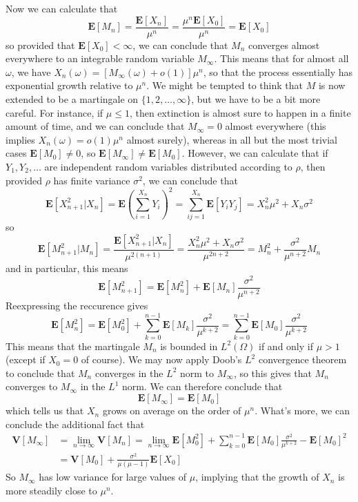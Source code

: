 Now we can calculate that
%
\[ \mathbf{E}[M_n] = \frac{\mathbf{E}[X_n]}{\mu^n} = \frac{\mu^n \mathbf{E}[X_0]}{\mu^n} = \mathbf{E}[X_0] \]
%
so provided that $\mathbf{E}[X_0] < \infty$, we can conclude that $M_n$ converges almost everywhere to an integrable random variable $M_\infty$. This means that for almost all $\omega$, we have $X_n(\omega) = [M_\infty(\omega) + o(1)] \mu^n$, so that the process essentially has exponential growth relative to $\mu^n$. We might be tempted to think that $M$ is now extended to be a martingale on $\{ 1, 2, \dots, \infty \}$, but we have to be a bit more careful. For instance, if $\mu \leq 1$, then extinction is almost sure to happen in a finite amount of time, and we can conclude that $M_\infty = 0$ almost everywhere (this implies $X_n(\omega) = o(1) \mu^n$ almost surely), whereas in all but the most trivial cases $\mathbf{E}[M_0] \neq 0$, so $\mathbf{E}[M_\infty] \neq \mathbf{E}[M_0]$. However, we can calculate that if $Y_1, Y_2, \dots$ are independent random variables distributed according to $\rho$, then provided $\rho$ has finite variance $\sigma^2$, we can conclude that
%
\[ \mathbf{E}[X_{n+1}^2|X_n] = \mathbf{E} \left( \sum_{i = 1}^{X_n} Y_i \right)^2 = \sum_{ij = 1}^{X_n} \mathbf{E}[Y_iY_j] = X_n^2 \mu^2 + X_n \sigma^2 \]
%
so
%
\[ \mathbf{E}[M_{n+1}^2|M_n] = \frac{\mathbf{E}[X_{n+1}^2|X_n]}{\mu^{2(n+1)}} = \frac{X_n^2 \mu^2 + X_n \sigma^2}{\mu^{2n+2}} = M_n^2 + \frac{\sigma^2}{\mu^{n + 2}} M_n \]
%
and in particular, this means
%
\[ \mathbf{E}[M_{n+1}^2] = \mathbf{E}[M_n^2] + \mathbf{E}[M_n] \frac{\sigma^2}{\mu^{n + 2}} \]
%
Reexpressing the reccurence gives
%
\[ \mathbf{E}[M_n^2] = \mathbf{E}[M_0^2] + \sum_{k = 0}^{n-1} \mathbf{E}[M_k] \frac{\sigma^2}{\mu^{k+2}} = \sum_{k = 0}^{n-1} \mathbf{E}[M_0] \frac{\sigma^2}{\mu^{k+2}} \]
%
This means that the martingale $M_n$ is bounded in $L^2(\Omega)$ if and only if $\mu > 1$ (except if $X_0 = 0$ of course). We may now apply Doob's $L^2$ convergence theorem to conclude that $M_n$ converges in the $L^2$ norm to $M_\infty$, so this gives that $M_n$ converges to $M_\infty$ in the $L^1$ norm. We can therefore conclude that
%
\[ \mathbf{E}[M_\infty] = \mathbf{E}[M_0] \]
%
which tells us that $X_n$ grows on average on the order of $\mu^n$. What's more, we can conclude the additional fact that
%
\begin{align*}
    \mathbf{V}[M_\infty] &= \lim_{n \to \infty} \mathbf{V}[M_n] = \lim_{n \to \infty} \mathbf{E}[M_0^2] + \sum_{k = 0}^{n-1} \mathbf{E}[M_0] \frac{\sigma^2}{\mu^{k+2}} - \mathbf{E}[M_0]^2\\
    &= \mathbf{V}[M_0] + \frac{\sigma^2}{\mu(\mu - 1)} \mathbf{E}[X_0]
\end{align*}
%
So $M_\infty$ has low variance for large values of $\mu$, implying that the growth of $X_n$ is more steadily close to $\mu^n$.

